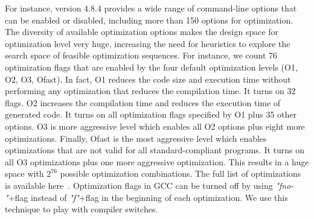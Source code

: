 For instance, version 4.8.4 provides a wide range of command-line options that can be enabled or disabled, including more than 150 options for optimization. The diversity of available optimization options makes the design space for optimization level very huge, increasing the need for heuristics to explore the search space of feasible optimization sequences.
For instance, we count 76 optimization flags that are enabled by the four default optimization levels (O1, O2, O3, Ofast). 
In fact, O1 reduces the code size and execution time without performing any optimization that reduces the compilation time. It turns on 32 flags. 
O2 increases the compilation time and reduces the execution time of generated code. It turns on all optimization flags specified by O1 plus 35 other options. 
O3 is more aggressive level which enables all O2 options plus eight more optimizations. 
Finally, Ofast is the most aggressive level which enables optimizations that are not valid for all standard-compliant programs. It turns on all O3 optimizations plus one more aggressive optimization. 
This results in a huge space with $2^{76}$ possible optimization combinations. The full list of optimizations is available here~\cite{mboussaa}.
Optimization flags in GCC can be turned off by using \textit{"fno-"}+flag instead of \textit{"f"}+flag in the beginning of each optimization. 
We use this technique to play with compiler switches.
\iffalse
